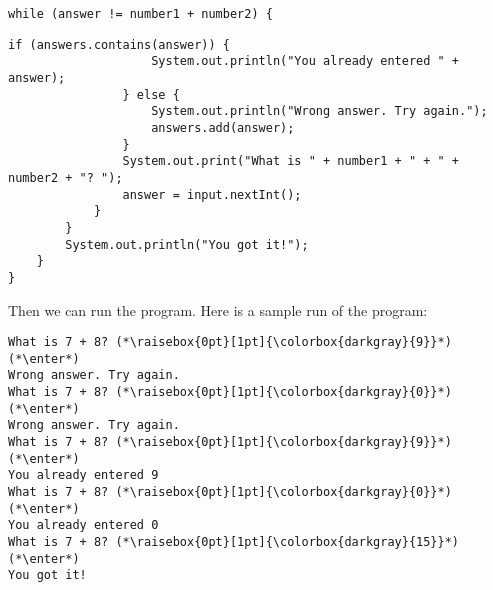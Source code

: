 \documentclass{article}
\newcommand{\enter}{\raisebox{-1.8pt}{\begin{tikzpicture}[scale=0.3]
    \draw[thin,fill=lightgray] (0,0) rectangle (2,1);
    \draw (0.3,0.3) -- (0.7,0.3)--(0.7,0.6);     
\end{tikzpicture}}}
\begin{document}
\begin{enumerate}
\begin{lstlisting}[backgroundcolor=\color{bg}]
            while (answer != number1 + number2) {
        \end{lstlisting}
        \begin{lstlisting}[backgroundcolor=\color{bg}]
                if (answers.contains(answer)) {
                    System.out.println("You already entered " + answer);
                } else {
                    System.out.println("Wrong answer. Try again.");
                    answers.add(answer);
                }
                System.out.print("What is " + number1 + " + " + number2 + "? ");
                answer = input.nextInt();
            }
        }
        System.out.println("You got it!");
    }
}
        \end{lstlisting}
        Then we can run the program. Here is a sample run of the program:
        \begin{lstlisting}[backgroundcolor=\color{vscode},basicstyle=\small\ttfamily\color{white}]
What is 7 + 8? (*\raisebox{0pt}[1pt]{\colorbox{darkgray}{9}}*) (*\enter*)
Wrong answer. Try again.
What is 7 + 8? (*\raisebox{0pt}[1pt]{\colorbox{darkgray}{0}}*) (*\enter*)
Wrong answer. Try again.
What is 7 + 8? (*\raisebox{0pt}[1pt]{\colorbox{darkgray}{9}}*) (*\enter*)
You already entered 9
What is 7 + 8? (*\raisebox{0pt}[1pt]{\colorbox{darkgray}{0}}*) (*\enter*)
You already entered 0
What is 7 + 8? (*\raisebox{0pt}[1pt]{\colorbox{darkgray}{15}}*) (*\enter*)
You got it!
        \end{lstlisting}
    \end{enumerate}
\end{document}
